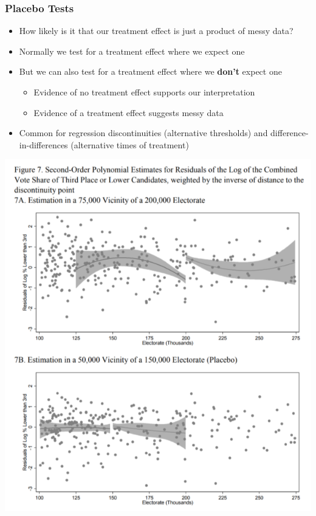 \documentclass[xcolor=x11names,compress]{beamer}\usepackage[]{graphicx}\usepackage[]{color}
\renewcommand{\(}{\begin{columns}}
\renewcommand{\)}{\end{columns}}
\newcommand{\<}[1]{\begin{column}{#1}}
\renewcommand{\>}{\end{column}}
\begin{document}
\begin{frame}
\frametitle{Placebo Tests}
\begin{itemize}
\item How likely is it that our treatment effect is just a product of messy data?
\pause
\item Normally we test for a treatment effect where we expect one
\pause
\item But we can also test for a treatment effect where we \textbf{don't} expect one
\begin{itemize}
\item Evidence of no treatment effect supports our interpretation
\pause
\item Evidence of a treatment effect suggests messy data
\end{itemize}
\pause
\item Common for regression discontinuities (alternative thresholds) and difference-in-differences (alternative times of treatment)
\end{itemize}
\end{frame}

\begin{frame}
\includegraphics[width=\linewidth]{placebo_2.png}
\end{frame}
\end{document}
